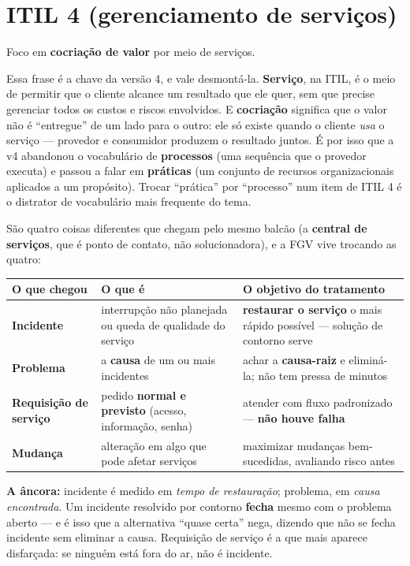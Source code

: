 \section{ITIL 4 (gerenciamento de serviços)}

Foco em \textbf{cocriação de valor} por meio de serviços.

Essa frase é a chave da versão 4, e vale desmontá-la. \textbf{Serviço}, na
ITIL, é o meio de permitir que o cliente alcance um resultado que ele quer, sem
que precise gerenciar todos os custos e riscos envolvidos. E \textbf{cocriação}
significa que o valor não é ``entregue'' de um lado para o outro: ele só
existe quando o cliente \emph{usa} o serviço --- provedor e consumidor produzem
o resultado juntos. É por isso que a v4 abandonou o vocabulário de
\textbf{processos} (uma sequência que o provedor executa) e passou a falar em
\textbf{práticas} (um conjunto de recursos organizacionais aplicados a um
propósito). Trocar ``prática'' por ``processo'' num item de ITIL 4 é o
distrator de vocabulário mais frequente do tema.

\begin{conceito}
São quatro coisas diferentes que chegam pelo mesmo balcão (a \textbf{central de
serviços}, que é ponto de contato, não solucionadora), e a FGV vive trocando as
quatro:

\begin{center}
\begin{tabular}{@{}p{2.7cm}p{4cm}p{4.6cm}@{}}
\toprule
\textbf{O que chegou} & \textbf{O que é} & \textbf{O objetivo do tratamento} \\
\midrule
\textbf{Incidente} & interrupção não planejada ou queda de qualidade do
serviço & \textbf{restaurar o serviço} o mais rápido possível --- solução de
contorno serve \\
\textbf{Problema} & a \textbf{causa} de um ou mais incidentes & achar a
\textbf{causa-raiz} e eliminá-la; não tem pressa de minutos \\
\textbf{Requisição de serviço} & pedido \textbf{normal e previsto} (acesso,
informação, senha) & atender com fluxo padronizado --- \textbf{não houve
falha} \\
\textbf{Mudança} & alteração em algo que pode afetar serviços & maximizar
mudanças bem-sucedidas, avaliando risco antes \\
\bottomrule
\end{tabular}
\end{center}

\textbf{A âncora:} incidente é medido em \emph{tempo de restauração};
problema, em \emph{causa encontrada}. Um incidente resolvido por contorno
\textbf{fecha} mesmo com o problema aberto --- e é isso que a alternativa
``quase certa'' nega, dizendo que não se fecha incidente sem eliminar a causa.
Requisição de serviço é a que mais aparece disfarçada: se ninguém está fora do
ar, não é incidente.
\end{conceito}


